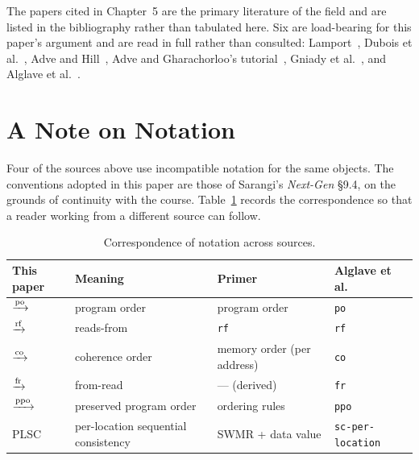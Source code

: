 The papers cited in Chapter~5 are the primary literature of the field and are
listed in the bibliography rather than tabulated here.
Six are load-bearing for
this paper's argument and are read in full rather than consulted:
Lamport~\cite{lamport1979multiprocessor}, Dubois et
al.~\cite{dubois1986memory}, Adve and Hill~\cite{adve1990weak}, Adve and
Gharachorloo's tutorial~\cite{adve1996shared}, Gniady et
al.~\cite{gniady1999sc}, and Alglave et al.~\cite{alglave2014herding}.

\section{A Note on Notation}

Four of the sources above use incompatible notation for the same objects.
The
conventions adopted in this paper are those of Sarangi's
\emph{Next-Gen} \S9.4, on the grounds of continuity with the course.
Table~\ref{tab:notation} records the correspondence so that a reader working from
a different source can follow.

\begin{table}[H]
\centering
\small
\begin{tabular}{@{}llll@{}}
\toprule
\textbf{This paper} & \textbf{Meaning} & \textbf{Primer} & \textbf{Alglave et al.} \\
\midrule
$\xrightarrow{\text{po}}$   & program order                & program order      & \texttt{po} \\
$\xrightarrow{\text{rf}}$   & reads-from                   & \texttt{rf}        & \texttt{rf} \\
$\xrightarrow{\text{co}}$   & coherence order              & memory order (per address) & \texttt{co} \\
$\xrightarrow{\text{fr}}$   & from-read                    & --- (derived)      & \texttt{fr} \\
$\xrightarrow{\text{ppo}}$  & preserved program order      & ordering rules     & \texttt{ppo} \\
PLSC    & per-location sequential consistency & SWMR + data value & \texttt{sc-per-location} \\
\bottomrule
\end{tabular}
\caption{Correspondence of notation across sources.}
\label{tab:notation}
\end{table}
